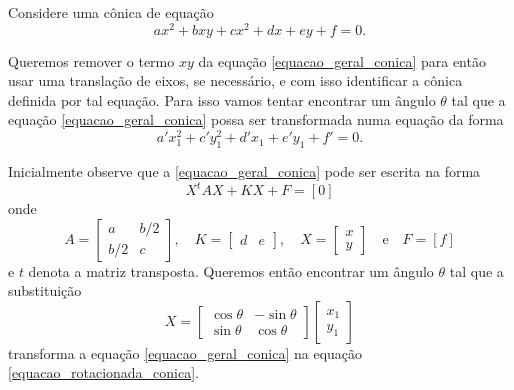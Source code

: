 

Considere uma c\^onica de equação
\begin{equation}\label{equacao_geral_conica}
  ax^2 + bxy + cx^2 + dx + ey + f = 0.
\end{equation}

Queremos remover o termo $xy$ da equação \eqref{equacao_geral_conica} para então usar uma translação de eixos, se necess\'ario, e com isso identificar a c\^onica definida por tal equação. Para isso vamos tentar encontrar um ângulo $\theta$ tal que a equação \eqref{equacao_geral_conica} possa ser transformada numa equação da forma
\begin{equation}\label{equacao_rotacionada_conica}
  a'x_1^2 + c'y_1^2 + d'x_1 + e'y_1 + f' = 0.
\end{equation}

Inicialmente observe que a \eqref{equacao_geral_conica} pode ser escrita na forma
\begin{equation}\label{equacao_matricial_conica}
  X^tAX + KX + F = [0]
\end{equation}
onde
\[
  A = \begin{bmatrix}
    a & b/2\\
    b/2 & c
  \end{bmatrix}
, \quad K = \begin{bmatrix}
  d & e
\end{bmatrix}, \quad X = \begin{bmatrix}
  x\\
  y
\end{bmatrix}\quad\mbox{e}\quad F = [f]
\]
e $t$ denota a matriz transposta. Queremos então encontrar um ângulo $\theta$ tal que a substituição
\begin{equation}\label{substituicao_rotacao_eixos}
  X = \begin{bmatrix}
    \cos\theta & -\sin\theta\\
    \sin\theta & \cos\theta
  \end{bmatrix}\begin{bmatrix}
    x_1\\y_1
  \end{bmatrix}
\end{equation}
transforma a equação \eqref{equacao_geral_conica} na equação \eqref{equacao_rotacionada_conica}.

